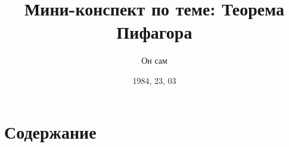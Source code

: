 \documentclass{article}
\title{Мини-конспект по теме: Теорема Пифагора}
\author{Он сам}
\date{1984, 23, 03}
\begin{document}
\maketitle

\section{Содержание}
\end{document}
